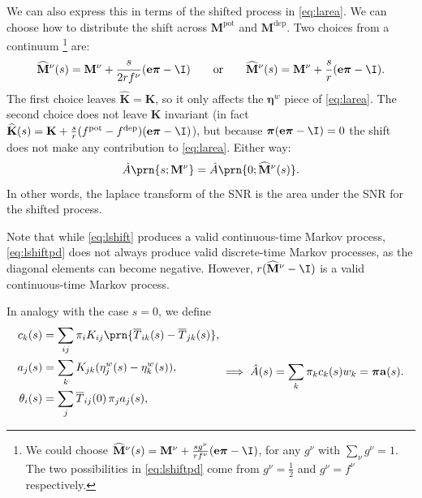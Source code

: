 \documentclass[12pt]{article}
\newcommand{\onev}{\mathbf{e}}
\newcommand{\eqm}{\pi}
\newcommand{\eq}{\boldsymbol{\eqm}}
\newcommand{\fptm}{T}
\newcommand{\fptbm}{\overline{\fptm}}
\newcommand{\etwm}{\eta^w}
\newcommand{\etw}{\boldsymbol{\eta}^w}
\newcommand{\thbm}{\theta}
\newcommand{\wm}{w}
\newcommand{\w}{\mathbf{\wm}}
\newcommand{\MMdm}{M}
\newcommand{\MMd}{\mathbf{\MMdm}}
\newcommand{\encm}{K}
\newcommand{\enc}{\mathbf{\encm}}
\newcommand{\pot}{^{\text{pot}}}
\newcommand{\dep}{^{\text{dep}}}
\newcommand{\shift}[1]{\widehat{#1}}
\begin{document}
We can also express this in terms of the shifted process in \cref{eq:larea}.
We can choose how to distribute the shift across \(\MMd \pot\) and \(\MMd \dep\).
Two choices from a continuum%
\footnote{We could choose \( \shift{\MMd}^\nu(s) = \MMd^\nu + \frac{s g^\nu}{r f^\nu} (\onev \eq - \I) \), for any \(g^\nu \) with \( \sum_\nu g^\nu = 1 \).
The two possibilities in \cref{eq:lshiftpd} come from \(g^\nu = \frac{1}{2}\) and \(g^\nu = f^\nu\) respectively.}
are:
%
\begin{equation}\label{eq:lshiftpd}
  \shift{\MMd}^\nu(s) = \MMd^\nu + \frac{s}{2 r f^\nu} (\onev \eq - \I)
  \qquad \text{or} \qquad
  \shift{\MMd}^\nu(s) = \MMd^\nu + \frac{s}{r} (\onev \eq - \I).
\end{equation}
%
The first choice leaves \( \shift{\enc} = \enc \), so it only affects the \(\etw\) piece of \cref{eq:larea}.
The second choice does not leave \(\enc\) invariant (in fact \( \shift{\enc}(s) = \enc + \frac{s}{r} (f\pot - f\dep) (\onev \eq - \I) \)), but because \( \eq (\onev \eq - \I) = 0 \) the shift does not make any contribution to \cref{eq:larea}.
Either way:
%
\begin{equation}\label{eq:lareashift}
  \hat{A}\prn{s; \MMd^\nu} = \hat{A}\prn{0; \shift{\MMd}^\nu(s)}.
\end{equation}
%
In other words, the laplace transform of the SNR is the area under the SNR for the shifted process.

Note that while \cref{eq:lshift} produces a valid continuous-time Markov process, \cref{eq:lshiftpd} does not always produce valid discrete-time Markov processes, as the diagonal elements can become negative.
However, \(r (\shift{\MMd}^\nu - \I)\) is a valid continuous-time Markov process.

In analogy with the case $s=0$, we define
%
\begin{equation}\label{eq:lareacoeffs}
  \begin{aligned}
    {c}_k(s) &= \sum_{ij} \eqm_i \encm_{ij} \prn{\fptbm_{ik}(s)-\fptbm_{jk}(s)}, \\
    {a}_j(s) &= \sum_{k} \encm_{jk} (\etwm_{j}(s) - \etwm_{k}(s)), \\
    \thbm_i(s) &= \sum_j \fptbm_{ij}(0)\, \eqm_j {a}_j(s), \\
  \end{aligned}
    \implies
    \hat{A}(s) 
      = \sum_k \eqm_k {c}_k(s) \wm_k
      = \eq \mathbf{a}(s).
\end{equation}
%
\end{document}
